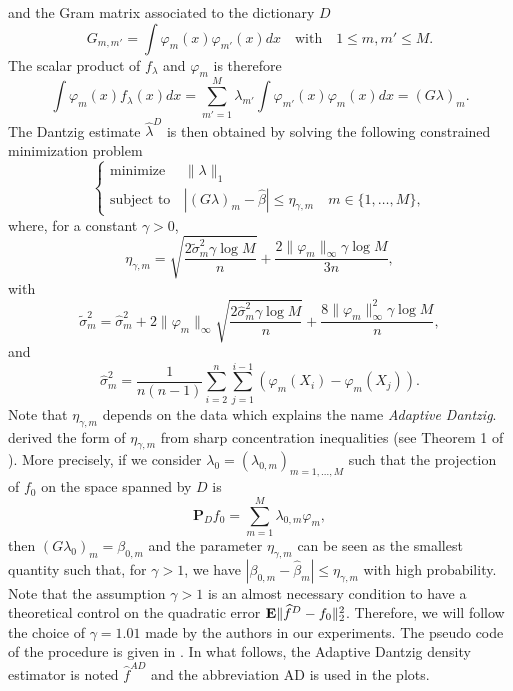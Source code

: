 and the Gram matrix associated to the dictionary $D$
\begin{equation}
    G_{m,m'}=\int\varphi_m(x)\varphi_{m'}(x)dx \quad \text{with}\quad 1\leq m,m' \leq M.
\end{equation}
The scalar product of $f_{\lambda}$ and $\varphi_m$ is therefore
\begin{equation}
    \int\varphi_m(x)f_{\lambda}(x)dx = \sum_{m'=1}^M\lambda_{m'}\int\varphi_{m'}(x)\varphi_m(x)dx = (G\lambda)_m.
\end{equation}
The Dantzig estimate $\hat\lambda^D$ is then obtained by solving the following constrained minimization problem
\begin{equation*}
    \left\{
    \begin{array}{ll}
        \text{minimize}\, &\|\lambda\|_1 \\
        \text{subject to}\, &|(G\lambda)_m-\hat\beta|\leq \eta_{\gamma,m} \quad m\in \{1,\dots,M\},
    \end{array} \right.
\end{equation*}
where, for a constant $\gamma > 0$,
\begin{equation}
    \eta_{\gamma,m} = \sqrt{\frac{2\tilde\sigma_m^2\gamma\log{M}}{n}}+ \frac{2\|\varphi_m\|_{\infty}\gamma\log{M}}{3n},
\end{equation}
with
\begin{equation}
    \tilde\sigma_m^2 = \hat\sigma_m^2+2\|\varphi_m \|_{\infty}\sqrt{\frac{2\hat\sigma_m^2\gamma\log{M}}{n}}+ \frac{8\|\varphi_m\|_{\infty}^2\gamma\log{M}}{n},
\end{equation}
and
\begin{equation}
    \hat\sigma^2_m = \frac{1}{n(n-1)}\sum_{i=2}^n\sum_{j=1}^{i-1}(\varphi_m(X_i)-\varphi_m(X_j)).
\end{equation}
Note that $\eta_{\gamma,m}$ depends on the data which explains the name \textit{Adaptive Dantzig}. \citep{Bertin} derived the form of $\eta_{\gamma,m}$ from sharp concentration inequalities (see Theorem 1 of \citep{Bertin}). More precisely, if we consider $\lambda_0=(\lambda_{0,m})_{m=1,\dots,M}$ such that the projection of $f_0$ on the space spanned by $D$ is
\begin{equation}
    \textbf{P}_{D}f_0=\sum_{m=1}^M\lambda_{0,m}\varphi_m,
\end{equation}
then $(G\lambda_0)_m=\beta_{0,m}$ and the parameter $\eta_{\gamma,m}$ can be seen as the smallest quantity such that, for $\gamma > 1$, we have $|\beta_{0,m}-\hat\beta_m|\leq \eta_{\gamma,m}$ with high probability. Note that the assumption $\gamma > 1$ is an almost necessary condition to have a theoretical control on the quadratic error $\mathbf E\|\widehat f^D-f_0 \|^2_2$. Therefore, we will follow the choice of $\gamma=1.01$ made by the authors in our experiments. The pseudo code of the procedure is given in . In what follows, the Adaptive Dantzig density estimator is noted $\hat f ^{AD}$ and the abbreviation AD is used in the plots.


